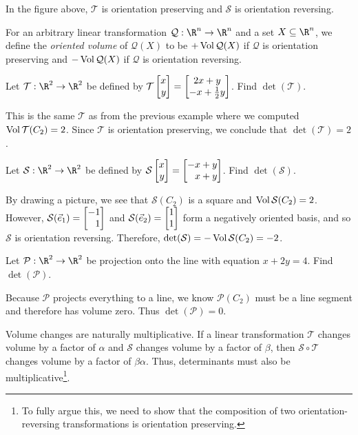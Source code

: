 In the figure above, $\mathcal T$ is orientation preserving and $\mathcal S$ is orientation reversing.

For an arbitrary linear transformation $\mathcal Q:\R^n\to\R^n$ and a set $X\subseteq\R^n$, we
define the \emph{oriented volume} of $\mathcal Q(X)$ to be $+\operatorname{Vol}\mathcal Q(X)$ if $\mathcal Q$ is
orientation preserving and $-\operatorname{Vol}\mathcal Q(X)$ if $\mathcal Q$ is orientation reversing.


\begin{example}
	Let $\mathcal T:\R^2\to\R^2$ be defined by $\mathcal T\mat{x\\y}=\matc{2x+y\\-x+\tfrac{1}{2}y}$.
	Find $\det(\mathcal T)$.

	This is the same $\mathcal T$ as from the previous example where we computed
	$\operatorname{Vol}\mathcal T(C_2)=2$. Since $\mathcal T$ is orientation preserving, we conclude that $\det(\mathcal T)=2$.
\end{example}
\begin{example}
	Let $\mathcal S:\R^2\to\R^2$ be defined by $\mathcal S\mat{x\\y}=\mat{-x+y\\x+y}$.
	Find $\det(\mathcal S)$.

	By drawing a picture, we see that $\mathcal S(C_2)$ is a square and $\operatorname{Vol}\mathcal S(C_2)=2$.
	However, $\mathcal S(\xhat) = \mat{-1\\1}$ and $\mathcal S(\yhat) = \mat{1\\1}$
	form a negatively oriented basis, and so $\mathcal S$ is orientation reversing. Therefore,
	$\det(\mathcal S) = - \operatorname{Vol}\mathcal S(C_2) = -2$.
\end{example}
\begin{example}
	Let $\mathcal P:\R^2\to\R^2$ be projection onto the line with equation $x+2y=4$. Find $\det(\mathcal P)$.

	Because $\mathcal P$ projects everything to a line, we know $\mathcal P(C_2)$ must be a line segment and
	therefore has volume zero. Thus $\det(\mathcal P)=0$.
\end{example}



Volume changes are naturally multiplicative. If a linear transformation $\mathcal T$ changes volume by a factor
of $\alpha$ and $\mathcal S$ changes volume by a factor of $\beta$, then $\mathcal S\circ \mathcal T$ changes
volume by a factor of $\beta\alpha$. Thus, determinants must also be multiplicative\footnote{ To fully argue this, we need
to show that the composition of two orientation-reversing transformations is orientation preserving.}.

